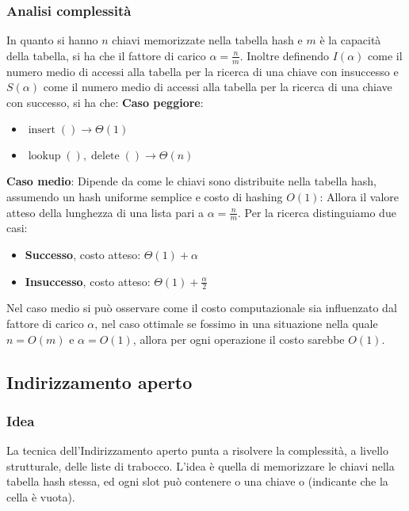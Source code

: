         \subsubsection{Analisi complessità}
        In quanto si hanno $n$ chiavi memorizzate nella tabella hash e $m$ è la capacità della tabella, si ha che il fattore di carico $\alpha = \frac{n}{m}$. Inoltre definendo $I(\alpha)$ come il numero medio di accessi alla tabella per la ricerca di una chiave con insuccesso e $S(\alpha)$ come il numero medio di accessi alla tabella per la ricerca di una chiave con successo, si ha che:\newline
        \textbf{Caso peggiore}:
        \begin{itemize}
            \item $\operatorname{insert}()\rightarrow \Theta(1)$
            \item $\operatorname{lookup}(), \operatorname{delete}()\rightarrow \Theta(n)$
        \end{itemize}
        \textbf{Caso medio}:
        Dipende da come le chiavi sono distribuite nella tabella hash, assumendo un hash uniforme semplice e costo di hashing $O(1)$:
        Allora il valore atteso della lunghezza di una lista pari a $\alpha = \frac{n}{m}$. Per la ricerca distinguiamo due casi:
        \begin{itemize}
            \item \textbf{Successo}, costo atteso: $\Theta(1)+\alpha$
            \item \textbf{Insuccesso}, costo atteso: $\Theta(1)+\frac\alpha2$
        \end{itemize}
        Nel caso medio si può osservare come il costo computazionale sia influenzato dal fattore di carico $\alpha$, nel caso ottimale se fossimo in una situazione nella quale $n=O(m)$ e $\alpha=O(1)$, allora per ogni operazione il costo sarebbe $O(1)$.
    \subsection{Indirizzamento aperto}
        \subsubsection{Idea}
            La tecnica dell'Indirizzamento aperto punta a risolvere la complessità, a livello strutturale, delle liste di trabocco. L'idea è quella di memorizzare le chiavi nella tabella hash stessa, ed ogni slot può contenere o una chiave o \Nil (indicante che la cella è vuota).
